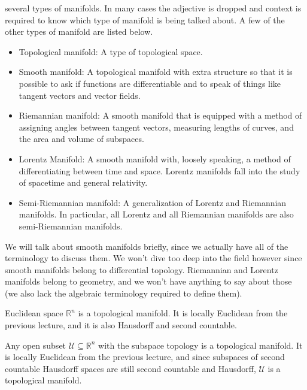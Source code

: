 \documentclass{article}
\theoremstyle{plain}
\theoremstyle{normal}
\newenvironment{example}{%
    \pushQED{\qed}\renewcommand{\qedsymbol}{$\blacksquare$}\examplex%
}{%
    \popQED\endexamplex%
}
\begin{document}
        several types of manifolds. In many cases the adjective is dropped and
        context is required to know which type of manifold is being talked
        about. A few of the other types of manifold are listed below.
        \begin{itemize}
            \item Topological manifold: A type of topological space.
            \item Smooth manifold: A topological manifold with extra structure
                so that it is possible to ask if functions are differentiable
                and to speak of things like tangent vectors and vector fields.
            \item Riemannian manifold: A smooth manifold that is equipped with
                a method of assigning angles between tangent vectors, measuring
                lengths of curves, and the area and volume of subspaces.
            \item Lorentz Manifold: A smooth manifold with, loosely speaking,
                a method of differentiating between time and space. Lorentz
                manifolds fall into the study of spacetime and general
                relativity.
            \item Semi-Riemannian manifold: A generalization of Lorentz and
                Riemannian manifolds. In particular, all Lorentz and all
                Riemannian manifolds are also semi-Riemannian manifolds.
        \end{itemize}
        We will talk about smooth manifolds briefly, since we actually have all
        of the terminology to discuss them. We won't dive too deep into the
        field however since smooth manifolds belong to differential topology.
        Riemannian and Lorentz manifolds belong to geometry, and we won't have
        anything to say about those (we also lack the algebraic terminology
        required to define them).
        \begin{example}
            Euclidean space $\mathbb{R}^{n}$ is a topological manifold. It is
            locally Euclidean from the previous lecture, and it is also
            Hausdorff and second countable.
        \end{example}
        \begin{example}
            Any open subset $\mathcal{U}\subseteq\mathbb{R}^{n}$ with the
            subspace topology is a topological manifold. It is locally Euclidean
            from the previous lecture, and since subspaces of second countable
            Hausdorff spaces are still second countable and Hausdorff,
            $\mathcal{U}$ is a topological manifold.
        \end{example}
\end{document}
